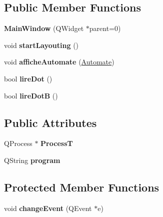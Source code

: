 \subsection*{Public Member Functions}
\begin{DoxyCompactItemize}
\item 
\hypertarget{class_main_window_a8b244be8b7b7db1b08de2a2acb9409db}{{\bfseries Main\-Window} (Q\-Widget $\ast$parent=0)}\label{class_main_window_a8b244be8b7b7db1b08de2a2acb9409db}

\item 
\hypertarget{class_main_window_a22ccaf0f029e895977c18774bf9ef115}{void {\bfseries start\-Layouting} ()}\label{class_main_window_a22ccaf0f029e895977c18774bf9ef115}

\item 
\hypertarget{class_main_window_ac9f5af352ce35293a2246f28af46b88c}{void {\bfseries affiche\-Automate} (\hyperlink{class_automate}{Automate})}\label{class_main_window_ac9f5af352ce35293a2246f28af46b88c}

\item 
\hypertarget{class_main_window_a7c730609e4e9f30d1b2dc88f8762a05c}{bool {\bfseries lire\-Dot} ()}\label{class_main_window_a7c730609e4e9f30d1b2dc88f8762a05c}

\item 
\hypertarget{class_main_window_ac9ec17b8cd9fe73a0cddfdc4423c9fb3}{bool {\bfseries lire\-Dot\-B} ()}\label{class_main_window_ac9ec17b8cd9fe73a0cddfdc4423c9fb3}

\end{DoxyCompactItemize}
\subsection*{Public Attributes}
\begin{DoxyCompactItemize}
\item 
\hypertarget{class_main_window_afe417a179b1efb0d372b4f8662cdd8e2}{Q\-Process $\ast$ {\bfseries Process\-T}}\label{class_main_window_afe417a179b1efb0d372b4f8662cdd8e2}

\item 
\hypertarget{class_main_window_a8edeaf68e7fac9c43d4b0cec2b859e90}{Q\-String {\bfseries program}}\label{class_main_window_a8edeaf68e7fac9c43d4b0cec2b859e90}

\end{DoxyCompactItemize}
\subsection*{Protected Member Functions}
\begin{DoxyCompactItemize}
\item 
\hypertarget{class_main_window_af4ca5d0d3d18ddcb7d54b6596bbf4797}{void {\bfseries change\-Event} (Q\-Event $\ast$e)}\label{class_main_window_af4ca5d0d3d18ddcb7d54b6596bbf4797}

\end{DoxyCompactItemize}


